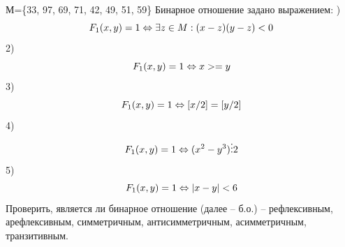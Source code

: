 
\renewcommand*{\proofname}{Решение}

\begin{problem}
    
    М=\{33, 97, 69, 71, 42, 49, 51, 59\}\newline
	Бинарное отношение задано выражением: ) $$ F_{1}(x,y)=1\Leftrightarrow\exists z\in M:(x-z)(y-z)<0\newline$$
  2) $$ F_{1}(x,y)=1\Leftrightarrow x>=y\newline$$
  3) $$ F_{1}(x,y)=1\Leftrightarrow [x/2]=[y/2] \newline$$
  4) $$ F_{1}(x,y)=1\Leftrightarrow (x^2 - y^3) \vdots 2\newline$$
  5) $$ F_{1}(x,y)=1\Leftrightarrow |x - y| < 6\newline$$
 \newline
 Проверить, является ли бинарное отношение (далее -- б.о.) -- рефлексивным, арефлексивным, симметричным, антисимметричным, асимметричным, транзитивным.
\end{problem}

